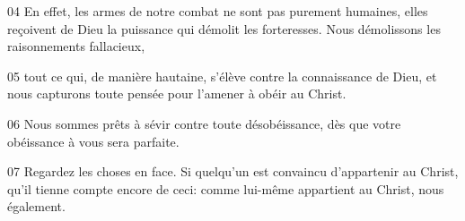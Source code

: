 
04 En effet, les armes de notre combat ne sont pas purement humaines, elles reçoivent de Dieu la puissance qui démolit les forteresses. Nous démolissons les raisonnements fallacieux,

05 tout ce qui, de manière hautaine, s’élève contre la connaissance de Dieu, et nous capturons toute pensée pour l’amener à obéir au Christ.

06 Nous sommes prêts à sévir contre toute désobéissance, dès que votre obéissance à vous sera parfaite.

07 Regardez les choses en face. Si quelqu’un est convaincu d’appartenir au Christ, qu’il tienne compte encore de ceci: comme lui-même appartient au Christ, nous également.
